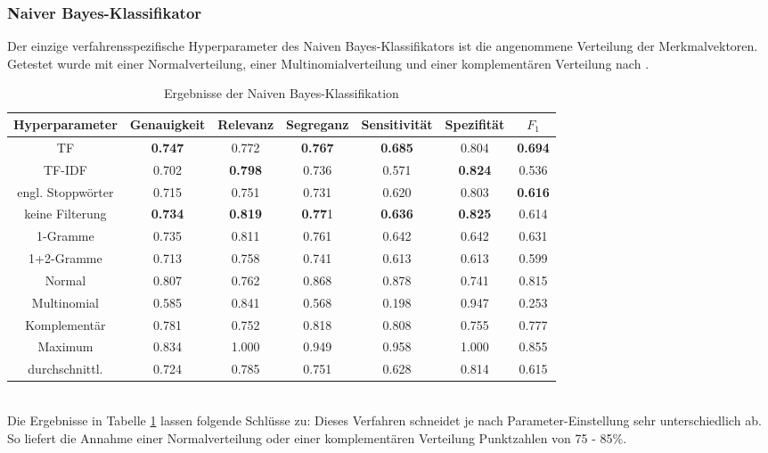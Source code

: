 \subsubsection{Naiver Bayes-Klassifikator}
Der einzige verfahrensspezifische Hyperparameter des Naiven Bayes-Klassifikators ist die angenommene Verteilung der Merkmalvektoren. Getestet wurde mit einer Normalverteilung, einer Multinomialverteilung und einer komplementären Verteilung nach \citet{rennie03}.
\begin{table}[htb]
	\begin{center}
		\begin{tabular}{|c|c|c|c|c|c|c|}
			\hline 
			Hyperparameter & Genauigkeit & Relevanz & Segreganz & Sensitivität & Spezifität & $F_1$ \\ \hline \hline
			TF         & \textbf{0.747} & 0.772 & \textbf{0.767} & \textbf{0.685} & 0.804 & \textbf{0.694} \\ \hline
			TF-IDF     & 0.702 & \textbf{0.798} & 0.736 & 0.571 & \textbf{0.824} & 0.536 \\ \hline \hline
			engl. Stoppwörter  & 0.715 & 0.751 & 0.731 & 0.620 & 0.803 & \textbf{0.616} \\ \hline
			keine Filterung    & \textbf{0.734} & \textbf{0.819} & \textbf{0.77}1 & \textbf{0.636} & \textbf{0.825} & 0.614 \\ \hline \hline
			1-Gramme    & 0.735 & 0.811 & 0.761 & 0.642 & 0.642 & 0.631 \\ \hline 
			1+2-Gramme  & 0.713 & 0.758 & 0.741 & 0.613 & 0.613 & 0.599 \\ \hline \hline
			Normal      & 0.807 & 0.762 & 0.868 & 0.878 & 0.741 & 0.815 \\ \hline 
			Multinomial & 0.585 & 0.841 & 0.568 & 0.198 & 0.947 & 0.253 \\ \hline 
			Komplementär& 0.781 & 0.752 & 0.818 & 0.808 & 0.755 & 0.777  \\ \hline 
			\hline
			Maximum        & 0.834 & 1.000 & 0.949 & 0.958 & 1.000 & 0.855 \\ \hline
			durchschnittl. & 0.724 & 0.785 & 0.751 & 0.628 & 0.814 & 0.615 \\ \hline
		\end{tabular}
		\caption{Ergebnisse der Naiven Bayes-Klassifikation}\label{results-nb}
	\end{center}
\end{table}\\
Die Ergebnisse in Tabelle \ref{results-nb} lassen folgende Schlüsse zu:
Dieses Verfahren schneidet je nach Parameter-Einstellung sehr unterschiedlich ab. So liefert die Annahme einer Normalverteilung oder einer komplementären Verteilung Punktzahlen von 75 - 85\%.
